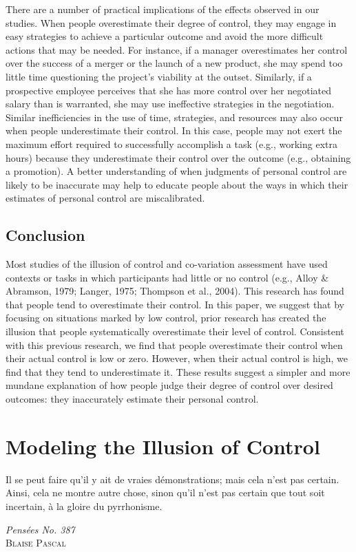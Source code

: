 \documentclass[USenglish,letterpaper,12pt,extrafontsizes,oneside,onecolumn,final]{memoir}
\begin{document}
There are a number of practical implications of the effects observed in our studies. When people overestimate their degree of control, they may engage in easy strategies to achieve a particular outcome and avoid the more difficult actions that may be needed. For instance, if a manager overestimates her control over the success of a merger or the launch of a new product, she may spend too little time questioning the project's viability at the outset. Similarly, if a prospective employee perceives that she has more control over her negotiated salary than is warranted, she may use ineffective strategies in the negotiation. Similar inefficiencies in the use of time, strategies, and resources may also occur when people underestimate their control. In this case, people may not exert the maximum effort required to successfully accomplish a task (e.g., working extra hours) because they underestimate their control over the outcome (e.g., obtaining a promotion). A better understanding of when judgments of personal control are likely to be inaccurate may help to educate people about the ways in which their estimates of personal control are miscalibrated.

\section{Conclusion}
Most studies of the illusion of control and co-variation assessment have used contexts or tasks in which participants had little or no control (e.g., Alloy \& Abramson, 1979; Langer, 1975; Thompson et al., 2004). This research has found that people tend to overestimate their control. In this paper, we suggest that by focusing on situations marked by low control, prior research has created the illusion that people systematically overestimate their level of control. Consistent with this previous research, we find that people overestimate their control when their actual control is low or zero. However, when their actual control is high, we find that they tend to underestimate it. These results suggest a simpler and more mundane explanation of how people judge their degree of control over desired outcomes: they inaccurately estimate their personal control. 

\chapter{Modeling the Illusion of Control}
\label{chap:model}

\epigraph{\SingleSpacing Il se peut faire qu'il y ait de vraies d\'{e}monstrations; mais cela n'est pas certain. Ainsi, cela ne montre autre chose, sinon qu'il n'est pas certain que tout soit incertain, \`{a} la gloire du pyrrhonisme.}{\textit{Pens\'{e}es No. 387}\\ \textsc{Blaise Pascal}}
\end{document}
